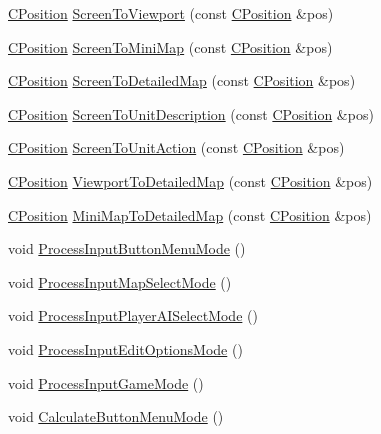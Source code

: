 \begin{DoxyCompactItemize}
\hyperlink{classCPosition}{C\+Position} \hyperlink{classCApplicationData_aebd3ae4cfd74962413024f1649233f08}{Screen\+To\+Viewport} (const \hyperlink{classCPosition}{C\+Position} \&pos)
\item 
\hyperlink{classCPosition}{C\+Position} \hyperlink{classCApplicationData_a61dfd0d1f56382b3a8f21add40e1f74a}{Screen\+To\+Mini\+Map} (const \hyperlink{classCPosition}{C\+Position} \&pos)
\item 
\hyperlink{classCPosition}{C\+Position} \hyperlink{classCApplicationData_a5c8b0ebf35fddb89b22f035544c32222}{Screen\+To\+Detailed\+Map} (const \hyperlink{classCPosition}{C\+Position} \&pos)
\item 
\hyperlink{classCPosition}{C\+Position} \hyperlink{classCApplicationData_a5400b710281ac2671d8d76aa442124ec}{Screen\+To\+Unit\+Description} (const \hyperlink{classCPosition}{C\+Position} \&pos)
\item 
\hyperlink{classCPosition}{C\+Position} \hyperlink{classCApplicationData_a2d956280cfd6074f56db3753c7467248}{Screen\+To\+Unit\+Action} (const \hyperlink{classCPosition}{C\+Position} \&pos)
\item 
\hyperlink{classCPosition}{C\+Position} \hyperlink{classCApplicationData_a2871f1b0855d14ed77db1abd83585d64}{Viewport\+To\+Detailed\+Map} (const \hyperlink{classCPosition}{C\+Position} \&pos)
\item 
\hyperlink{classCPosition}{C\+Position} \hyperlink{classCApplicationData_a3dabde94ddec0eb2c732525f54164bc5}{Mini\+Map\+To\+Detailed\+Map} (const \hyperlink{classCPosition}{C\+Position} \&pos)
\item 
void \hyperlink{classCApplicationData_a10e56e4604f1f0823af659a7989fea9d}{Process\+Input\+Button\+Menu\+Mode} ()
\item 
void \hyperlink{classCApplicationData_a4fb3ad6900161476b5dace2d7cf9908c}{Process\+Input\+Map\+Select\+Mode} ()
\item 
void \hyperlink{classCApplicationData_a096afda0b6459cfa73d66518ce23f68e}{Process\+Input\+Player\+A\+I\+Select\+Mode} ()
\item 
void \hyperlink{classCApplicationData_a345f47a19a5abcc9aeeb6b02b4aaf31b}{Process\+Input\+Edit\+Options\+Mode} ()
\item 
void \hyperlink{classCApplicationData_a018490e670662ed9a9266449516a2ac7}{Process\+Input\+Game\+Mode} ()
\item 
void \hyperlink{classCApplicationData_a5654dc28e14fa5bbc9ceb630d5259f91}{Calculate\+Button\+Menu\+Mode} ()
\item 

\end{DoxyCompactItemize}

